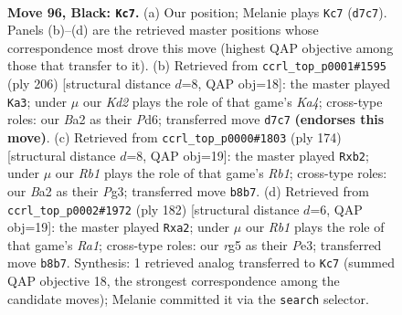 \documentclass[11pt]{article}
\begin{document}
\clearpage

\begin{figure}[p]\centering
\begin{subfigure}{0.46\textwidth}\centering
\resizebox{\linewidth}{!}{%
\newchessgame
\chessboard[
  setfen={1r6/1P1k4/8/6R1/8/4K3/b7/5R2 b - - 0 96},
  showmover=false,
  pgfstyle=straightmove, color=movearrow, markmove={d7-c7}
]}
\caption{}
\end{subfigure}\hfill
\begin{subfigure}{0.46\textwidth}\centering
\resizebox{\linewidth}{!}{%
\newchessgame
\chessboard[
  setfen={8/8/1r1P4/8/K2k4/8/p7/R7 w - - 13 104},
  showmover=false,
  pgfstyle=straightmove, color=movearrow, markmove={a4-a3}
]}
\caption{}
\end{subfigure}
\\[4pt]
\begin{subfigure}{0.46\textwidth}\centering
\resizebox{\linewidth}{!}{%
\newchessgame
\chessboard[
  setfen={8/8/3k4/8/8/r5P1/1p1K4/1R6 w - - 4 88},
  showmover=false,
  pgfstyle=straightmove, color=movearrow, markmove={b1-b2}
]}
\caption{}
\end{subfigure}\hfill
\begin{subfigure}{0.46\textwidth}\centering
\resizebox{\linewidth}{!}{%
\newchessgame
\chessboard[
  setfen={8/7r/8/8/2k5/4P3/p1K5/R7 w - - 12 92},
  showmover=false,
  pgfstyle=straightmove, color=movearrow, markmove={a1-a2}
]}
\caption{}
\end{subfigure}
\caption{\textbf{Move 96, Black: \texttt{Kc7}.} (a) Our position; Melanie plays \texttt{Kc7} (\texttt{d7c7}). Panels (b)--(d) are the retrieved master positions whose correspondence most drove this move (highest QAP objective among those that transfer to it). (b) Retrieved from \texttt{ccrl\_top\_p0001\#1595} (ply 206) [structural distance $d$=8, QAP obj=18]: the master played \texttt{Ka3}; under $\mu$ our \emph{Kd2} plays the role of that game's \emph{Ka4}; cross-type roles: our \emph{B}a2 as their \emph{P}d6; transferred move \texttt{d7c7} \textbf{(endorses this move)}. (c) Retrieved from \texttt{ccrl\_top\_p0000\#1803} (ply 174) [structural distance $d$=8, QAP obj=19]: the master played \texttt{Rxb2}; under $\mu$ our \emph{Rb1} plays the role of that game's \emph{Rb1}; cross-type roles: our \emph{B}a2 as their \emph{P}g3; transferred move \texttt{b8b7}. (d) Retrieved from \texttt{ccrl\_top\_p0002\#1972} (ply 182) [structural distance $d$=6, QAP obj=19]: the master played \texttt{Rxa2}; under $\mu$ our \emph{Rb1} plays the role of that game's \emph{Ra1}; cross-type roles: our \emph{r}g5 as their \emph{P}e3; transferred move \texttt{b8b7}. Synthesis: 1 retrieved analog transferred to \texttt{Kc7} (summed QAP objective 18, the strongest correspondence among the candidate moves); Melanie committed it via the \texttt{search} selector.}
\label{fig:thought-m191}
\end{figure}
\end{document}

